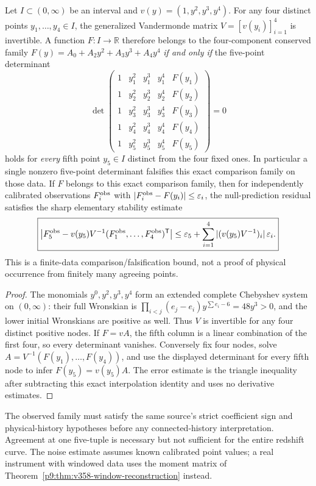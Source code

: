 \documentclass[12pt,a4paper]{article}
\begin{document}
\begin{theorem}
\label{p9:thm:cc15-five-point-null}
Let $I\subset(0,\infty)$ be an interval and
$v(y)=(1,y^2,y^3,y^4)$. For any four distinct points
$y_1,\ldots,y_4\in I$, the generalized Vandermonde matrix
$V=[v(y_i)]_{i=1}^4$ is invertible. A function $F:I\to\mathbb R$
therefore belongs to the four-component conserved family
$F(y)=A_0+A_2y^2+A_3y^3+A_4y^4$ \emph{if and only if} the
five-point determinant
\[
 \boxed{\det\!\begin{pmatrix}
 1&y_1^2&y_1^3&y_1^4&F(y_1)\\
 1&y_2^2&y_2^3&y_2^4&F(y_2)\\
 1&y_3^2&y_3^3&y_3^4&F(y_3)\\
 1&y_4^2&y_4^3&y_4^4&F(y_4)\\
 1&y_5^2&y_5^3&y_5^4&F(y_5)
 \end{pmatrix}=0}
\]
holds for \emph{every} fifth point $y_5\in I$ distinct from the
four fixed ones. In particular a single nonzero five-point
determinant falsifies this exact comparison family on those data.
If $F$ belongs to this exact comparison family, then for
independently calibrated observations $F_i^{\rm obs}$ with
$|F_i^{\rm obs}-F(y_i)|\le\varepsilon_i$, the null-prediction
residual satisfies the sharp elementary stability estimate
\[
 \boxed{\left|F_5^{\rm obs}
 -v(y_5)V^{-1}(F_1^{\rm obs},\ldots,F_4^{\rm obs})^{\mathsf T}\right|
 \le\varepsilon_5+\sum_{i=1}^{4}
  |(v(y_5)V^{-1})_i|\,\varepsilon_i.}
\]
This is a finite-data comparison/falsification bound, not a proof of
physical occurrence from finitely many agreeing points.
\end{theorem}
\begin{proof}
The monomials $y^0,y^2,y^3,y^4$ form an extended complete
Chebyshev system on $(0,\infty)$: their full Wronskian is
$\prod_{i<j}(e_j-e_i)y^{\sum e_i-6}=48y^3>0$, and the lower
initial Wronskians are positive as well. Thus $V$ is invertible
for any four distinct positive nodes.
If $F=vA$, the fifth column is a linear combination of the first
four, so every determinant vanishes. Conversely fix four nodes,
solve $A=V^{-1}(F(y_1),\ldots,F(y_4))$, and use the displayed
determinant for every fifth node to infer $F(y_5)=v(y_5)A$.
The error estimate is the triangle inequality after subtracting
this exact interpolation identity and uses no derivative estimates.
\end{proof}
\begin{remark}
The observed family must satisfy the same source's strict coefficient
sign and physical-history hypotheses before any connected-history
interpretation. Agreement at one five-tuple is necessary but not
sufficient for the entire redshift curve. The noise estimate assumes
known calibrated point values; a real instrument with windowed data
uses the moment matrix of
Theorem~\ref{p9:thm:v358-window-reconstruction} instead.
\end{remark}
\end{document}
